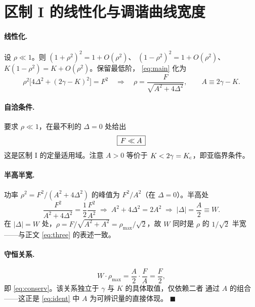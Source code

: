 \section{区制 I 的线性化与调谐曲线宽度}
\label{app:regimeI}

\paragraph{线性化.}
设 $\rho\ll1$。则 $(1+\rho^{2})^{2}=1+O(\rho^{2})$、
$(1-\rho^{2})^{2}=1+O(\rho^{2})$、$K(1-\rho^{2})=K+O(\rho^{2})$。保留最低阶，
\cref{eq:main} 化为
%
\begin{equation}
\rho^{2}\bigl[4\Delta^{2}+(2\gamma-K)^{2}\bigr]=F^{2}
\quad\Longrightarrow\quad
\rho=\frac{F}{\sqrt{A^{2}+4\Delta^{2}}},
\qquad A\equiv2\gamma-K .
\end{equation}

\paragraph{自洽条件.}
要求 $\rho\ll1$，在最不利的 $\Delta=0$ 处给出
%
\begin{equation}
\boxed{\,F\ll A\,}
\end{equation}
%
这是区制 I 的定量适用域。注意 $A>0$ 等价于 $K<2\gamma=K_{\mathrm{c}}$，即亚临界条件。

\paragraph{半高半宽.}
功率 $\rho^{2}=F^{2}/(A^{2}+4\Delta^{2})$ 的峰值为 $F^{2}/A^{2}$（在
$\Delta=0$）。半高处
%
\begin{equation}
\frac{F^{2}}{A^{2}+4\Delta^{2}}=\frac{1}{2}\frac{F^{2}}{A^{2}}
\;\Longrightarrow\;
A^{2}+4\Delta^{2}=2A^{2}
\;\Longrightarrow\;
|\Delta|=\frac{A}{2}\equiv W .
\end{equation}
%
在 $|\Delta|=W$ 处，$\rho=F/\sqrt{A^{2}+A^{2}}=\rho_{\max}/\sqrt{2}$，故 $W$
同时是 $\rho$ 的 $1/\sqrt2$ 半宽——与正文 \cref{eq:three} 的表述一致。

\paragraph{守恒关系.}
\begin{equation}
W\cdot\rho_{\max}=\frac{A}{2}\cdot\frac{F}{A}=\frac{F}{2},
\end{equation}
%
即 \cref{eq:conserv}。该关系独立于 $\gamma$ 与 $K$ 的具体取值，仅依赖二者
通过 $A$ 的组合——这正是 \cref{eq:ident} 中 $A$ 为可辨识量的直接体现。
\hfill$\blacksquare$

